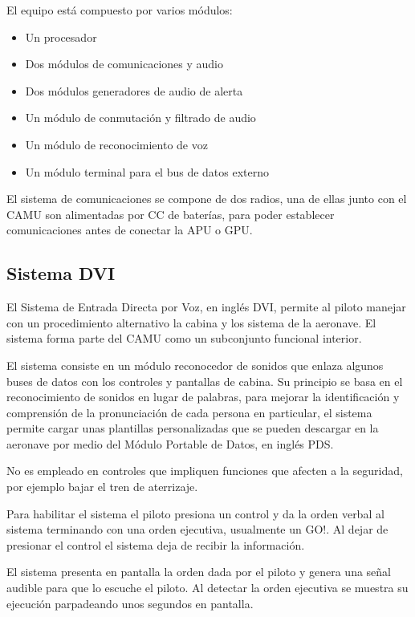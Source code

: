 El equipo est\'a compuesto por varios m\'odulos:

\begin{itemize}
\item Un procesador
\item Dos m\'odulos de comunicaciones y audio
\item Dos m\'odulos generadores de audio de alerta
\item Un m\'odulo de conmutaci\'on y filtrado de audio
\item Un m\'odulo de reconocimiento de voz
\item Un m\'odulo terminal para el bus de datos externo
\end{itemize}

El sistema de comunicaciones se compone de dos radios, una de ellas junto con el CAMU son alimentadas por CC de bater\'ias, para poder establecer comunicaciones antes de conectar la APU o GPU. 

\subsection{Sistema DVI}
\label{sec:09.03.02.DVI}

El Sistema de Entrada Directa por Voz, en ingl\'es  \ac{DVI},  permite al piloto manejar con un procedimiento
alternativo la cabina y los sistema de la aeronave.  El sistema forma parte del \ac{CAMU} como un subconjunto funcional interior.

El sistema consiste en un m\'odulo reconocedor de sonidos que enlaza algunos buses de datos con los controles y pantallas de cabina. Su principio se basa en el reconocimiento de sonidos en lugar de palabras, para mejorar la identificaci\'on y comprensi\'on de la pronunciaci\'on de cada persona en particular, el sistema permite cargar unas plantillas personalizadas que se pueden descargar en la aeronave por medio del M\'odulo Portable de Datos, en ingl\'es \ac{PDS}. 

No es empleado en controles que impliquen funciones que afecten a la seguridad, por ejemplo bajar el tren de aterrizaje.

Para habilitar el sistema el piloto presiona un control y da la orden verbal al sistema terminando con una orden ejecutiva, usualmente un GO!. Al dejar de presionar el control el sistema deja de recibir la informaci\'on. 

El sistema presenta en pantalla la orden dada por el piloto y genera una se\~nal audible para que lo escuche el piloto. Al detectar la orden ejecutiva se muestra su ejecuci\'on parpadeando unos segundos en pantalla.

